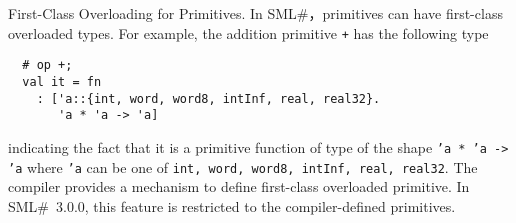 \documentclass{jbook}
\newif\ifjp
\newcommand{\smlsharp}{SML\#}
\newcommand{\version}{3.0.0}
\begin{document}
\begin{itemize}
\ifjp%
	プリミティブへの第一級オーバーロード型の導入．
	\smlsharp{}は，主にSQL統合をよりスムーズにサポートするため，
プリミティブ演算子を第一級のオーバーローディング演算子として扱う機構を導
入している．
	例えば，加算演算子{\tt +}は以下のような型を持つ．
\begin{verbatim}
  # op +;
  val it = fn
    : ['a::{int, word, word8, intInf, real, real32}.
       'a * 'a -> 'a]
\end{verbatim}
	この型は，{\tt +}が
に{\tt int, word, word8, intInf, real, real32}対して多重定義された
関数であることを示している．
	\smlsharp{}コンパイラは，多重定義プリミティブを定義する機構を含
むが，\smlsharp{}~\version{}版ではこの機構はユーザに公開されていない．
\else%
	First-Class Overloading for Primitives.
	In \smlsharp{}，primitives can have first-class overloaded
types.
	For example, the addition primitive {\tt +} has the following type
\begin{verbatim}
  # op +;
  val it = fn
    : ['a::{int, word, word8, intInf, real, real32}.
       'a * 'a -> 'a]
\end{verbatim}
indicating the fact that it is a primitive function of type of
the shape {\tt 'a * 'a -> 'a} where {\tt 'a} can be one of
{\tt int, word, word8, intInf, real, real32}.
	The compiler provides a mechanism to define first-class
overloaded primitive.
	In \smlsharp{}~\version{}, this feature is restricted 
to the compiler-defined primitives.
\fi%
\end{itemize}
\end{document}
